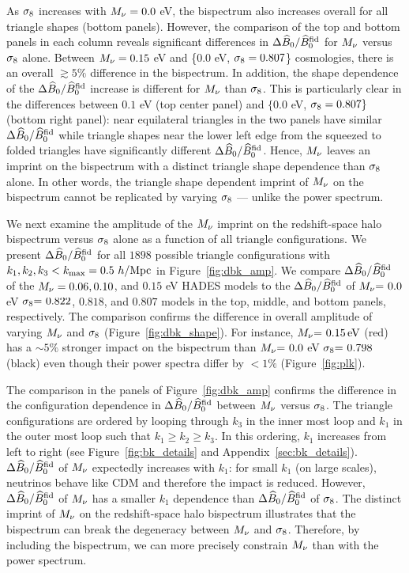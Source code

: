 As $\sigma_8$ increases with $M_\nu = 0.0$ eV, the bispectrum also increases 
overall for all triangle shapes (bottom panels). However, the comparison of the
top and bottom panels in each column reveals significant differences in 
$\Delta \widehat{B}_0/\widehat{B}_0^{\rm fid}$ for $M_\nu$ versus $\sigma_8$ alone. Between 
$M_\nu=0.15$ eV and \{$0.0$ eV, $\sigma_8 = 0.807$\} cosmologies, there is an overall 
$\gtrsim 5\%$ difference in the bispectrum. In addition, the shape dependence 
of the $\Delta \widehat{B}_0/\widehat{B}_0^{\rm fid}$ increase is different for $M_\nu$ than $\sigma_8$. 
This is particularly clear in the differences between $0.1$ eV (top center panel) 
and $\{$0.0 eV, $\sigma_8=0.807\}$ 
(bottom right panel): near equilateral triangles in the two panels have similar 
$\Delta \widehat{B}_0/\widehat{B}_0^{\rm fid}$ while triangle shapes near the lower left edge from 
the squeezed to folded triangles have significantly different $\Delta \widehat{B}_0/\widehat{B}_0^{\rm fid}$. 
Hence, $M_\nu$ leaves an imprint on the bispectrum with a distinct triangle 
shape dependence than $\sigma_8$ alone. In other words, the triangle shape dependent 
imprint of $M_\nu$ on the bispectrum cannot be replicated by varying $\sigma_8$ --- 
unlike the power spectrum. 

We next examine the amplitude of the $M_\nu$ imprint on the redshift-space halo 
bispectrum versus $\sigma_8$ alone as a function of all triangle configurations. We present 
$\Delta \widehat{B}_0/\widehat{B}_0^{\rm fid}$ for all $1898$ possible triangle configurations 
with $k_1, k_2, k_3 < k_{\rm max} = 0.5~h/{\rm Mpc}$ in Figure~\ref{fig:dbk_amp}. 
We compare $\Delta \widehat{B}_0/\widehat{B}_0^{\rm fid}$ of the $M_\nu = 0.06, 0.10$, and 
$0.15$ eV HADES models to the $\Delta \widehat{B}_0/\widehat{B}_0^\mathrm{fid}$ of 
$M_\nu{=}~0.0$ eV $\sigma_8{=}~0.822$, $0.818$, and $0.807$ models in the
top, middle, and bottom panels, respectively. The comparison confirms the 
difference in overall amplitude of varying $M_\nu$ and $\sigma_8$ (Figure~\ref{fig:dbk_shape}). 
For instance, $M_\nu{=}~0.15\,\mathrm{eV}$ (red) has a $\sim 5\%$ stronger 
impact on the bispectrum than $M_\nu{=}~0.0$ eV $\sigma_8{=}~0.798$ (black) 
even though their power spectra differ by $< 1\%$ (Figure~\ref{fig:plk}).

The comparison in the panels of Figure~\ref{fig:dbk_amp} confirms the difference 
in the configuration dependence in $\Delta \widehat{B}_0/\widehat{B}_0^\mathrm{fid}$ between $M_\nu$ 
versus $\sigma_8$. The triangle configurations are ordered by looping through $k_3$ 
in the inner most loop and $k_1$ in the outer most loop such that $k_1 \geq k_2 \geq k_3$. 
In this ordering, $k_1$ increases from left to right (see Figure~\ref{fig:bk_details} 
and Appendix~\ref{sec:bk_details}). $\Delta \widehat{B}_0/\widehat{B}_0^\mathrm{fid}$ 
of $M_\nu$ expectedly increases with $k_1$: for small $k_1$ (on large scales), 
neutrinos behave like CDM and therefore the impact is reduced. However, 
$\Delta \widehat{B}_0/\widehat{B}_0^\mathrm{fid}$ of $M_\nu$ has a smaller $k_1$ dependence than 
$\Delta \widehat{B}_0/\widehat{B}_0^\mathrm{fid}$ of $\sigma_8$. The distinct imprint of $M_\nu$ on the redshift-space 
halo bispectrum illustrates that the bispectrum can break the degeneracy between 
$M_\nu$ and $\sigma_8$. Therefore, by including the bispectrum, we can more precisely
constrain $M_\nu$ than with the power spectrum. 
